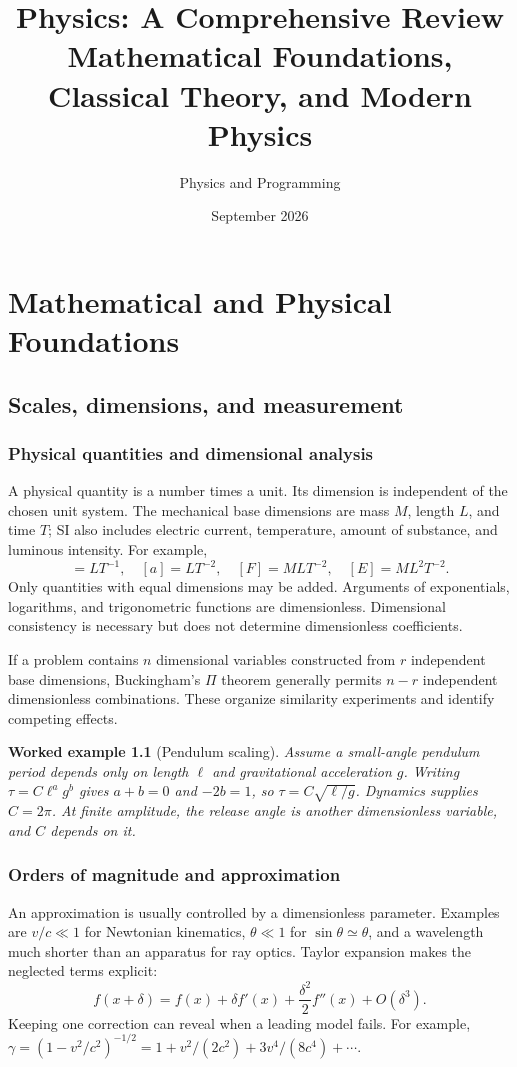 \documentclass[11pt,oneside]{book}
\title{Physics: A Comprehensive Review\\\large Mathematical Foundations, Classical Theory, and Modern Physics}
\author{Physics and Programming}
\date{September 2026}
\theoremstyle{reviewstyle}
\newtheorem{example}{Worked example}[chapter]
\begin{document}
\frontmatter
\hypersetup{pageanchor=false}
\maketitle
\hypersetup{pageanchor=true}
\tableofcontents
\mainmatter
\part{Mathematical and Physical Foundations}
\chapter{Scales, dimensions, and measurement}
\section{Physical quantities and dimensional analysis}
A physical quantity is a number times a unit. Its dimension is independent of the chosen unit system. The mechanical base dimensions are mass $M$, length $L$, and time $T$; SI also includes electric current, temperature, amount of substance, and luminous intensity. For example,
\begin{equation}
[v]=LT^{-1},\quad [a]=LT^{-2},\quad [F]=MLT^{-2},\quad [E]=ML^2T^{-2}.
\end{equation}
Only quantities with equal dimensions may be added. Arguments of exponentials, logarithms, and trigonometric functions are dimensionless. Dimensional consistency is necessary but does not determine dimensionless coefficients.

If a problem contains $n$ dimensional variables constructed from $r$ independent base dimensions, Buckingham's $\Pi$ theorem generally permits $n-r$ independent dimensionless combinations. These organize similarity experiments and identify competing effects.
\begin{example}[Pendulum scaling]
Assume a small-angle pendulum period depends only on length $\ell$ and gravitational acceleration $g$. Writing $\tau=C\ell^ag^b$ gives $a+b=0$ and $-2b=1$, so $\tau=C\sqrt{\ell/g}$. Dynamics supplies $C=2\pi$. At finite amplitude, the release angle is another dimensionless variable, and $C$ depends on it.
\end{example}
\section{Orders of magnitude and approximation}
An approximation is usually controlled by a dimensionless parameter. Examples are $v/c\ll1$ for Newtonian kinematics, $\theta\ll1$ for $\sin\theta\simeq\theta$, and a wavelength much shorter than an apparatus for ray optics. Taylor expansion makes the neglected terms explicit:
\begin{equation}
f(x+\delta)=f(x)+\delta f'(x)+\frac{\delta^2}{2}f''(x)+O(\delta^3).
\end{equation}
Keeping one correction can reveal when a leading model fails. For example,
$\gamma=(1-v^2/c^2)^{-1/2}=1+v^2/(2c^2)+3v^4/(8c^4)+\cdots$.
\end{document}

